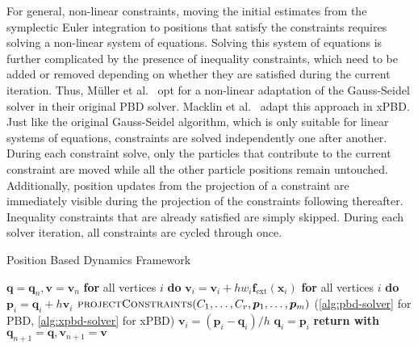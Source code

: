 For general, non-linear constraints, moving the initial estimates from the symplectic Euler integration to positions that satisfy the constraints
requires solving a non-linear system of equations. Solving this system of equations is further complicated by the presence of inequality constraints, which
need to be added or removed depending on whether they are satisfied during the current iteration. Thus, Müller et al.\ \cite{mueller2006} opt for a 
non-linear adaptation of the Gauss-Seidel solver in their original PBD solver. Macklin et al.\ \cite{macklin2016} adapt this approach in xPBD. 
Just like the original Gauss-Seidel algorithm, which is only suitable for linear systems of equations, 
constraints are solved independently one after another. During each constraint solve, only the particles that contribute to the current constraint are
moved while all the other particle positions remain untouched. Additionally, position updates from the projection of a constraint are immediately 
visible during the projection of the constraints following thereafter. Inequality constraints that are already satisfied are simply skipped. 
During each solver iteration, all constraints are cycled through once.

\begin{algorithm}
\caption{Position Based Dynamics Framework}\label{alg:pbd}
\begin{algorithmic}[1]
\State $\bm{q} = \bm{q}_n, \bm{v} = \bm{v}_n$
\State \textbf{for} all vertices $i$ \textbf{do} $\bm{v}_i = \bm{v}_i + hw_i\bm{f}_{\text{ext}}(\bm{x}_i)$
\State \textbf{for} all vertices $i$ \textbf{do} $\bm{p}_i = \bm{q}_i + h\bm{v}_i$
\State $\textsc{projectConstraints}(C_1, \ldots, C_r, \bm{p}_1, \ldots, \bm{p}_m)$ (\cref{alg:pbd-solver} for PBD, 
\StatexIndent[2] \cref{alg:xpbd-solver} for xPBD)
\State $\bm{v}_i = (\bm{p}_i - \bm{q}_i) / h$
\State $\bm{q}_i = \bm{p}_i$
\EndFor
\State \textbf{return with } $\bm{q}_{n+1} = \bm{q}, \bm{v}_{n+1} = \bm{v}$
\EndProcedure
\end{algorithmic}
\end{algorithm}


